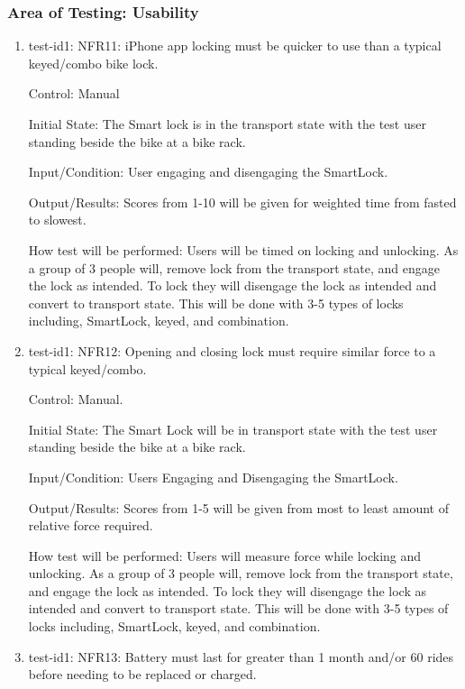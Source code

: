 \documentclass[12pt, titlepage]{article}
\begin{document}
\subsubsection{Area of Testing: Usability}

\begin{enumerate}

\item{test-id1: NFR11: iPhone app locking must be quicker to use than a typical keyed/combo bike lock.  \\}

Control: Manual 

Initial State: The Smart lock is in the transport state with the test user standing beside the bike at a bike rack.

Input/Condition: User engaging and disengaging the SmartLock.

Output/Results: Scores from 1-10 will be given for weighted time from fasted to slowest.

How test will be performed: Users will be timed on locking and unlocking. As a group of 3 people will, remove lock from the transport state, and engage the lock as intended. To lock they will disengage the lock as intended and convert to transport state. This will be done with 3-5 types of locks including, SmartLock, keyed, and combination.

\item{test-id1: NFR12: Opening and closing lock must require similar force to a typical keyed/combo.  \\}

Control: Manual.

Initial State: The Smart Lock will be in transport state with the test user standing beside the bike at a bike rack.

Input/Condition: Users Engaging and Disengaging the SmartLock.

Output/Results: Scores from 1-5 will be given from most to least amount of relative force required.

How test will be performed: Users will measure force while locking and unlocking. As a group of 3 people will, remove lock from the transport state, and engage the lock as intended. To lock they will disengage the lock as intended and convert to transport state. This will be done with 3-5 types of locks including, SmartLock, keyed, and combination.

\item{test-id1: NFR13: Battery must last for greater than 1 month and/or 60 rides before needing to be replaced or charged.  \\}


\end{enumerate}
\end{document}
